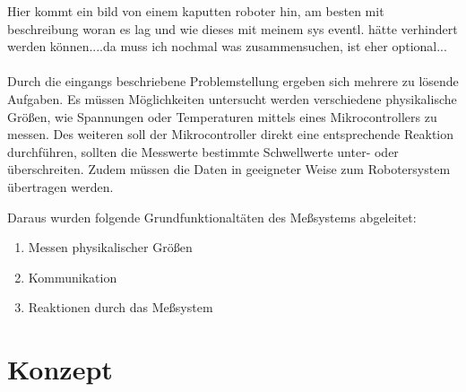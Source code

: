 \documentclass[
	11pt,								%
	a4paper,						%
	oneside,						%
	titlepage,					%
	headsepline,				%
	DIV13,							%
	abstracton,	 				%
	BCOR0cm,						%
	bibliography=totoc, %
]{scrreprt}							%
\begin{document}
 
Hier kommt ein bild von einem kaputten roboter hin, am besten mit beschreibung woran es lag und wie dieses mit meinem sys eventl. hätte verhindert 
werden können....da muss ich nochmal was zusammensuchen, ist eher optional...\\
\\

Durch die eingangs beschriebene Problemstellung ergeben sich mehrere zu lösende Aufgaben.
Es müssen Möglichkeiten untersucht werden verschiedene physikalische Größen, wie Spannungen oder Temperaturen mittels eines Mikrocontrollers zu messen.
Des weiteren soll der Mikrocontroller direkt eine entsprechende Reaktion durchführen, sollten die Messwerte bestimmte Schwellwerte unter- oder überschreiten. 
Zudem müssen die Daten in geeigneter Weise zum Robotersystem übertragen werden.\newline

Daraus wurden folgende Grundfunktionaltäten des Meßsystems abgeleitet:\newline
 

\begin{enumerate}
 \item Messen physikalischer Größen
 \item Kommunikation 
 \item Reaktionen durch das Meßsystem
\end{enumerate}




\chapter{Konzept}
\label{cha:Konzept}
\end{document}
